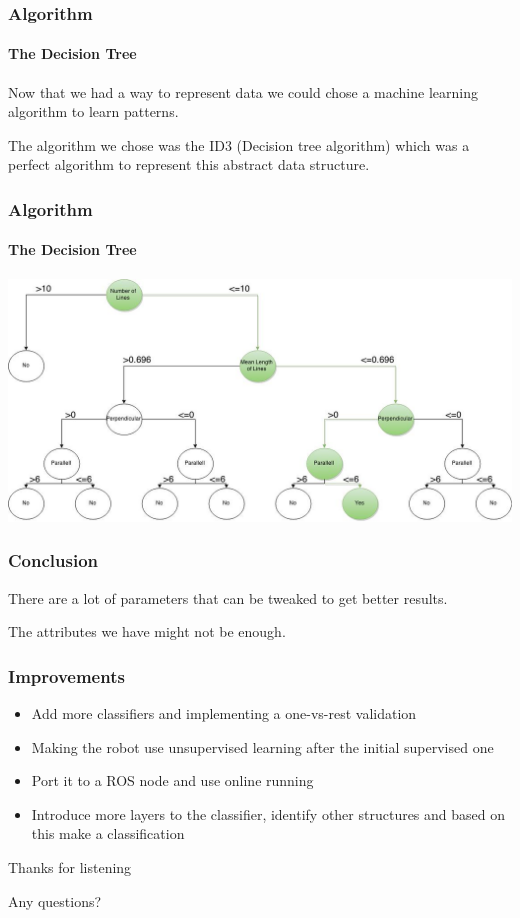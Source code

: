 \documentclass{beamer}
\begin{document}
\begin{frame}
\frametitle{Algorithm}
\framesubtitle{The Decision Tree}

Now that we had a way to represent data we could chose a machine learning algorithm to learn patterns.

\pause
\vspace{10pt}

The algorithm we chose was the ID3 (Decision tree algorithm) which was a perfect algorithm to represent this abstract data structure.


\end{frame}

\begin{frame}[fragile]
\frametitle{Algorithm}
\framesubtitle{The Decision Tree}
\includegraphics[scale=0.3]{presimg/id3.jpg}

\end{frame}

\begin{frame}
\frametitle{Conclusion}
 There are a lot of parameters that can be tweaked to get better results.

 \pause 
 \vspace{10pt}

The attributes we have might not be enough.
\end{frame}

\begin{frame}
\frametitle{Improvements}

\begin{itemize}
\item{Add more classifiers and implementing a one-vs-rest validation}
\pause
\item{Making the robot use unsupervised learning after the initial supervised one}
\pause
\item{Port it to a ROS node and use online running}
\pause
\item{Introduce more layers to the classifier, identify other structures and based on this make a classification}
\end{itemize}

\end{frame}

\begin{frame}

\centering

Thanks for listening

\vspace{10pt}

Any questions?

\end{frame}
\end{document}
